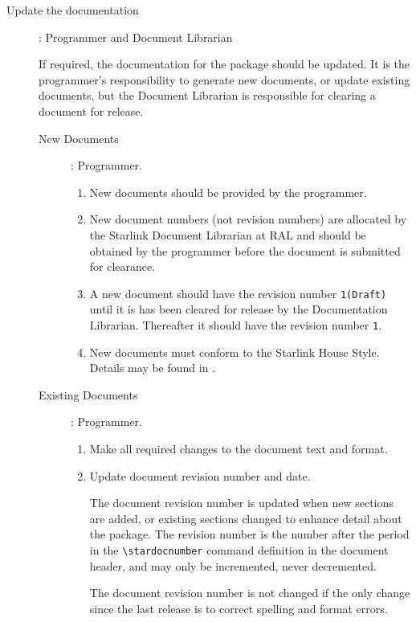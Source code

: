 \begin{description}
\item[Update the documentation]: Programmer and Document Librarian

If required, the documentation for the package should be updated.  It
is the programmer's responsibility to generate new documents, or
update existing documents, but the Document Librarian is
responsible for clearing a document for release.

\begin{description}

\item [New Documents]:  Programmer.

\begin{enumerate}

\item New documents should be provided by the programmer.

\item New document numbers (not revision numbers) are allocated by the
Starlink Document Librarian at RAL and should be obtained by the
programmer before the document is submitted for clearance.

\item A new document should have the revision number {\tt{1(Draft)}}
until it is has been cleared for release by the Documentation
Librarian.  Thereafter it should have the revision number {\tt{1}}.

\item New documents must conform to the Starlink House Style.  Details
may be found in .

\end{enumerate}

\item [Existing Documents]: Programmer.

\begin{enumerate}

\item Make all required changes to the document text and format.

\item Update document revision number and date.

The document revision number is updated when new sections are
added, or existing sections changed to enhance detail about the
package.  The revision number is the number after the period in the
{\verb+\stardocnumber+} command definition in the document header, and
may only be incremented, never decremented.

The document revision number is not changed if the only change since
the last release is to correct spelling and format errors. 


\end{enumerate}
\end{description}
\end{description}
